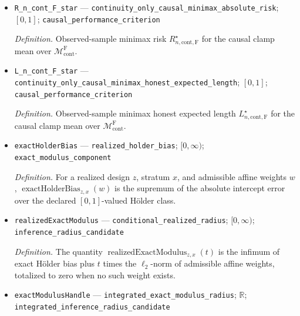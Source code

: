 \documentclass{article}
\begin{document}
\begin{itemize}
  \par\smallskip\noindent\emph{Definition.} Carrier-heterogeneous continuity-only full-data class \(\mathcal M_{\mathrm{cont}}^{\mathrm F}\).
  \item \texttt{R\_\allowbreak{}n\_\allowbreak{}cont\_\allowbreak{}F\_\allowbreak{}star} --- \texttt{continuity\_\allowbreak{}only\_\allowbreak{}causal\_\allowbreak{}minimax\_\allowbreak{}absolute\_\allowbreak{}risk}; \([0,1]\); \texttt{causal\_\allowbreak{}performance\_\allowbreak{}criterion}
  \par\smallskip\noindent\emph{Definition.} Observed-sample minimax risk \(R_{n,\mathrm{cont},\mathrm F}^\star\) for the causal clamp mean over \(\mathcal M_{\mathrm{cont}}^{\mathrm F}\).
  \item \texttt{L\_\allowbreak{}n\_\allowbreak{}cont\_\allowbreak{}F\_\allowbreak{}star} --- \texttt{continuity\_\allowbreak{}only\_\allowbreak{}causal\_\allowbreak{}minimax\_\allowbreak{}honest\_\allowbreak{}expected\_\allowbreak{}length}; \([0,1]\); \texttt{causal\_\allowbreak{}performance\_\allowbreak{}criterion}
  \par\smallskip\noindent\emph{Definition.} Observed-sample minimax honest expected length \(L_{n,\mathrm{cont},\mathrm F}^\star\) for the causal clamp mean over \(\mathcal M_{\mathrm{cont}}^{\mathrm F}\).
  \item \texttt{exactHolderBias} --- \texttt{realized\_\allowbreak{}holder\_\allowbreak{}bias}; \([0,\infty)\); \texttt{exact\_\allowbreak{}modulus\_\allowbreak{}component}
  \par\smallskip\noindent\emph{Definition.} For a realized design \(z\), stratum \(x\), and admissible affine weights \(w\), \(\operatorname{exactHolderBias}_{z,x}(w)\) is the supremum of the absolute intercept error over the declared \([0,1]\)-valued Hölder class.
  \item \texttt{realizedExactModulus} --- \texttt{conditional\_\allowbreak{}realized\_\allowbreak{}radius}; \([0,\infty)\); \texttt{inference\_\allowbreak{}radius\_\allowbreak{}candidate}
  \par\smallskip\noindent\emph{Definition.} The quantity \(\operatorname{realizedExactModulus}_{z,x}(t)\) is the infimum of exact Hölder bias plus \(t\) times the \(\ell_2\)-norm of admissible affine weights, totalized to zero when no such weight exists.
  \item \texttt{exactModulusHandle} --- \texttt{integrated\_\allowbreak{}exact\_\allowbreak{}modulus\_\allowbreak{}radius}; \(\mathbb R\); \texttt{integrated\_\allowbreak{}inference\_\allowbreak{}radius\_\allowbreak{}candidate}

\end{itemize}
\end{document}
